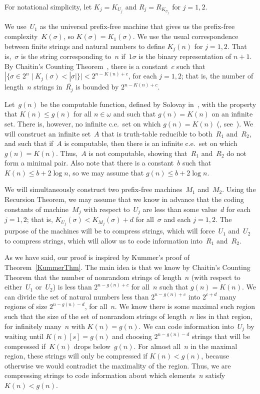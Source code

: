 \documentclass{LMCS}
\newcommand{\0}{\mathbf{0}}
\newcommand{\ov}{\overline}
\newcommand{\ce}{c.e.\ }
\newcommand{\RKUO}{R_1}
\newcommand{\RKUT}{R_2}
\newcommand{\KUj}{K_j}
\newcommand{\<}{\langle}
\renewcommand{\>}{\rangle}
\begin{document}
For notational simplicity, let $K_j=K_{U_j}$ and $R_j=R_{K_{U_j}}$ for
$j=1,2$.

We use~$U_1$ as the universal prefix-free machine that gives us the
prefix-free complexity~$K(\sigma)$, so $K(\sigma)=K_1(\sigma)$.  We use the
usual correspondence between finite strings and natural numbers to define
$\KUj(n)$ for $j=1, 2$.  That is,~$\sigma$ is the string corresponding to~$n$
if~$1\sigma$ is the binary representation of $n+1$.
By Chaitin's Counting Theorem~\cite{Chaitin}, there is a constant~$c$ such
that $|\{\sigma\in 2^n \mid \KUj(\sigma)<|\sigma|\}|< 2^{n-K(n)+c}$, for each
$j=1, 2$; that is, the number of length~$n$ strings in~$\ov{R_j}$ is bounded
by $2^{n-K(n)+c}$.

Let~$g(n)$ be the computable function, defined by Solovay in~\cite{Solovay},
with the property that $K(n)\leq g(n)$ for all $n\in \omega$ and such that
$g(n)=K(n)$ on an infinite set.  There is, however, no infinite \ce set on
which $g(n)=K(n)$ (\cite{Solovay}, see~\cite[p.~132]{Gacs}).
We will construct an infinite set~$A$ that is truth-table reducible to
both~$\RKUO$ and~$\RKUT$, and such that if~$A$ is computable, then there is
an infinite \ce set on which $g(n)=K(n)$.  Thus,~$A$ is not computable,
showing that~$\RKUO$ and~$\RKUT$ do not form a minimal pair.  Also note that
there is a constant~$b$ such that $K(n)\leq b+2\log n$, so we may assume that
$g(n)\leq b+2\log n$.

We will simultaneously construct two prefix-free machines~$M_1$ and~$M_2$.
Using the Recursion Theorem, we may assume that we know in advance that the
coding constants of machine~$M_j$ with respect to~$U_j$ are less than some
value~$d$ for each $j=1,2$; that is, $K_{U_j}(\sigma)<K_{M_j}(\sigma)+d$ for
all~$\sigma$ and each $j=1,2$.
The purpose of the machines will be to compress strings, which will
force~$U_1$ and~$U_2$ to compress strings, which will allow us to code
information into~$\RKUO$ and~$\RKUT$.

As we have said, our proof is inspired by Kummer's proof of
Theorem~\ref{KummerThm}.  The main idea is that we know by Chaitin's Counting
Theorem that the number of nonrandom strings of length~$n$ (with respect to
either~$U_1$ or~$U_2$) is less than $2^{n-g(n)+c}$ for all~$n$ such that
$g(n)=K(n)$.  We can divide the set
of natural numbers less than
$2^{n-g(n)+c}$ into $2^{c+d}$ many regions of size $2^{n-g(n)-d}$, for
all~$n$.  We know there is some maximal such region such that the size of the
set of nonrandom strings of length~$n$ lies in that region, for infinitely
many~$n$ with $K(n)=g(n)$.
We can code information into~$U_j$ by waiting until $K(n)[s]=g(n)$ and
choosing $2^{n-g(n)-d}$ strings that will be compressed if~$K(n)$ drops
below~$g(n)$.  For almost all~$n$ in the maximal region, these strings will
only be compressed if $K(n)<g(n)$, because otherwise we would contradict the
maximality of the region.  Thus, we are compressing strings to code
information about which elements~$n$ satisfy $K(n)<g(n)$.
\end{document}
